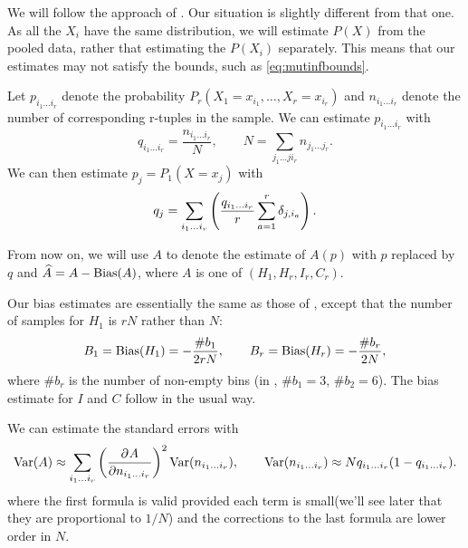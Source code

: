 \documentclass[12pt]{article}
\begin{document}
We will follow the approach of \cite{Roulston1999}. Our situation is slightly different from that one. As all the $X_i$ have the same distribution, we will estimate $P(X)$ from the pooled data, rather that estimating the $P(X_i)$ separately. This means that our estimates may not satisfy the bounds, such as \eqref{eq:mutinfbounds}.

Let $p_{i_1\ldots i_r}$ denote the probability $P_r(X_1=x_{i_1},\ldots,X_r=x_{i_r})$ and $n_{i_1\ldots i_r}$ denote the number of corresponding r-tuples in the sample. We can estimate $p_{i_1\ldots i_r}$ with
%
\begin{equation}\label{eq:tupprob}
  q_{i_1\ldots i_r} = \frac{n_{i_1\ldots i_r}}{N},
  \qquad
  N = \sum_{j_1\ldots ji_r} n_{j_1\ldots j_r}.
\end{equation}
%
We can then estimate $p_{j}=P_1(X=x_{j})$ with
%
\begin{equation}\label{eq:singprob}
  q_j = \sum_{i_1\ldots i_r}\left (  \frac{q_{i_1\ldots i_r}}{r} \sum_{a=1}^r \delta_{j,i_a} \right ).
\end{equation}
%

From now on, we will use $A$ to denote the estimate of $A(p)$ with $p$ replaced by $q$ and $\widehat{A}=A-\operatorname{Bias}(A)$, where $A$ is one of $(H_1,H_r,I_r,C_r)$.

Our bias estimates are essentially the same as those of \cite{Roulston1999}, except that the number of samples for $H_1$ is $rN$ rather than $N$:
%
\begin{equation}\label{eq:biasH}
  B_1 = \operatorname{Bias}(H_1) = -\frac{\#b_1}{2rN},
  \qquad
  B_r = \operatorname{Bias}(H_r) = -\frac{\#b_r}{2N},
\end{equation}
%
where $\#b_r$ is the number of non-empty bins (\eg in , $\#b_1=3$, $\#b_2=6$). The bias estimate for $I$ and $C$ follow in the usual way.

We can estimate the standard errors with
%
\begin{equation}\label{eq:stderr}
  \var(A) \approx \sum_{i_1\ldots i_r} \prn{\pdiff{A}{n_{i_1\ldots i_r}}}^2 \var(n_{i_1\ldots i_r}),
  \qquad
  \var(n_{i_1\ldots i_r}) \approx N q_{i_1\ldots i_r}(1-q_{i_1\ldots i_r}).
\end{equation}
%
where the first formula is valid provided each term is small(we'll see later that they are proportional to $1/N$) and the corrections to the last formula are lower order in $N$.
\end{document}
